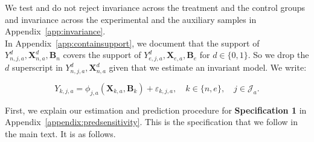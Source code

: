 \noindent We test and do not reject invariance across the treatment and the control groups and invariance across the experimental and the auxiliary samples  in Appendix~\ref{app:invariance}.\\

\noindent In Appendix~\ref{app:containsupport}, we document that the support of $Y_{n,j,a}^d, \bm{X}_{n,a}^d, \bm{B}_{n}$ covers the support of $Y_{e,j,a}^d, \bm{X}_{e,a}, \bm{B}_{e}$ for $d \in \{0, 1\}$. So we drop the $d$ superscript in $Y_{n,j,a}^d, \bm{X}_{n,a}^d$ given that we estimate an invariant model. We write:

\begin{equation}\label{eq:routcome}
Y_{k,j,a} = \phi_{j,a} (\bm{X}_{k,a}, \bm{B}_k) + \varepsilon_{k,j,a}, \quad k \in \{n,e\}, \quad j \in \mathcal{J}_a.
\end{equation}

\noindent First, we explain our estimation and prediction procedure for \textbf{Specification 1} in Appendix~\ref{appendix:predsensitivity}. This is the specification that we follow in the main text. It is as follows. 

